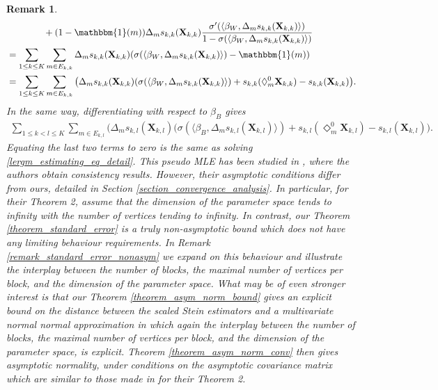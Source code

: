 \documentclass{article}
\newtheorem{Remark}[Theorem]{Remark}
\begin{document}
\begin{Remark}
\begin{align*}
        & \qquad \qquad + (1-\mathbbm{1}(m)) \Delta_m s_{k,k}(\mathbf{X}_{k,k}) \frac{\sigma'(\langle \beta_W, \Delta_m s_{k,k}(\mathbf{X}_{k,k}) \rangle )}{1-\sigma(\langle \beta_W, \Delta_m s_{k,k}(\mathbf{X}_{k,k}) \rangle )} \\
        &=  \sum_{1 \leq k \leq K} \sum_{m \in E_{k,k}} \Delta_m s_{k,k} (\mathbf{X}_{k,k})(\sigma(\langle \beta_W, \Delta_m s_{k,k}(\mathbf{X}_{k,k}) \rangle ) - \mathbbm{1}(m) ) \\
        &=  \sum_{1 \leq k \leq K} \sum_{m \in E_{k,k}} \big( \Delta_m s_{k,k} (\mathbf{X}_{k,k})(\sigma(\langle \beta_W, \Delta_m s_{k,k}(\mathbf{X}_{k,k}) \rangle ) +  s_{k,k}(\Diamond_{m}^{0}\mathbf{X}_{k,k}) - s_{k,k}(\mathbf{X}_{k,k}) \big).
    \end{align*}
    In the same way, differentiating with respect to $\beta_B$ gives
    \begin{align*}
        \sum_{1 \leq k < l \leq K} \sum_{m \in E_{k,l}} \big( \Delta_m s_{k,l} (\mathbf{X}_{k,l})(\sigma(\langle \beta_B, \Delta_m s_{k,l}(\mathbf{X}_{k,l}) \rangle ) +  s_{k,l}(\Diamond_{m}^{0}\mathbf{X}_{k,l}) - s_{k,l}(\mathbf{X}_{k,l}) \big).
    \end{align*}
    Equating the last two terms to zero is the same as solving \eqref{lergm_estimating_eq_detail}. This pseudo MLE has been studied in \cite[Theorem 2]{stewart2026pseudo}, where the authors obtain consistency results. However, their asymptotic conditions differ from ours, detailed in Section \ref{section_convergence_analysis}. In particular, for their Theorem 2, \cite{stewart2026pseudo} assume that the dimension of the parameter space tends to infinity with the number of vertices tending to infinity. In contrast, our Theorem \ref{theorem_standard_error} is a truly non-asymptotic bound which does not have any limiting behaviour requirements. In Remark \ref{remark_standard_error_nonasym} we expand on this behaviour and illustrate the interplay between the number of blocks, the maximal number of vertices per block, and the dimension of the parameter space. What may be of even stronger interest is that our Theorem \ref{theorem_asym_norm_bound}  gives an explicit bound on the distance between the scaled Stein estimators and a multivariate normal normal approximation in which again the interplay between the number of blocks, the maximal number of vertices per block, and the dimension of the parameter space, is explicit. Theorem \ref{theorem_asym_norm_conv} then gives asymptotic normality, under conditions on the asymptotic covariance matrix which are similar to those made in \cite{stewart2026pseudo} for their Theorem 2.
\end{Remark}
\end{document}

